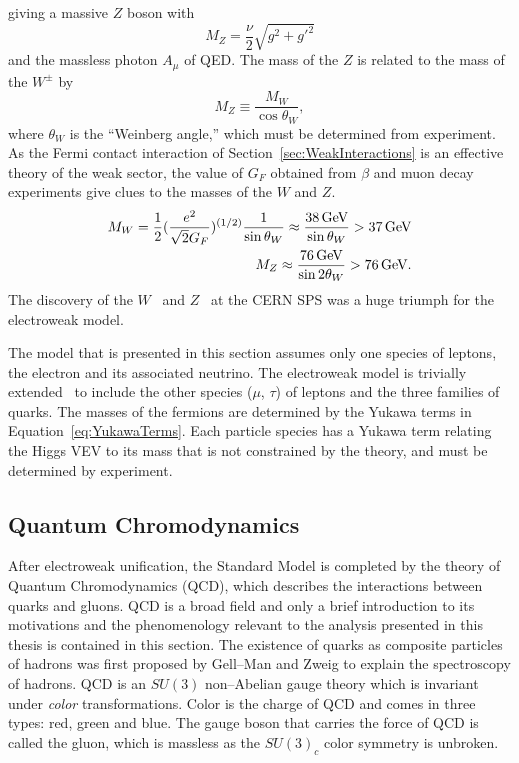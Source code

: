 giving a massive $Z$ boson with 
\begin{equation}
  M_Z = \frac{\nu}{2}\sqrt{g^2 + g'^2} 
  \label{eq:ZBosonMass}
\end{equation}
and the massless photon $A_\mu$ of QED\@.  The mass of the $Z$ is related to the
mass of the $W^\pm$ by 
\begin{equation}
  M_Z \equiv \frac{M_W}{\cos \theta_W},
  \nonumber
\end{equation}
where $\theta_W$ is the ``Weinberg angle,'' which must be determined from
experiment.  As the Fermi contact interaction of
Section~\ref{sec:WeakInteractions} is an effective theory of the weak sector,
the value of $G_F$ obtained from $\beta$ and muon decay experiments give clues
to the masses of the $W$ and $Z$.  
\begin{eqnarray}
  M_W = \frac{1}{2}(\frac{e^2}{\sqrt 2 G_F})^{(1/2)}\frac{1}{\sin\theta_W} \approx
  \frac{38 \,\text{Ge\hspace{-.08em}V}}{\sin\theta_W} > 37 \,\text{Ge\hspace{-.08em}V} \nonumber \\ 
  M_Z \approx \frac{76 \,\text{Ge\hspace{-.08em}V}}{\sin
  2\theta_W} > 76\,\text{Ge\hspace{-.08em}V}\nonumber.
\end{eqnarray}
The discovery of the $W$~\cite{UA1WDiscovery,UA2WDiscovery} and
$Z$~\cite{UA1ZDiscovery, UA2ZDiscovery} at the CERN SPS was a huge triumph for
the electroweak model.

The model that is presented in this section assumes only one species of leptons,
the electron and its associated neutrino.  The electroweak model is trivially
extended~\cite{Morii:SMandBSM} to include the other species ($\mu$, $\tau$) of
leptons and the three families of quarks. The masses of the fermions are
determined by the Yukawa terms in Equation~\ref{eq:YukawaTerms}.  Each particle
species has a Yukawa term relating the Higgs VEV to its mass that is not
constrained by the theory, and must be determined by experiment.

\subsection{Quantum Chromodynamics}

After electroweak unification, the Standard Model is completed by the theory of
Quantum Chromodynamics (QCD), which describes the interactions between quarks
and gluons.  QCD is a broad field and only a brief introduction to its
motivations and the phenomenology relevant to the analysis presented in this
thesis is contained in this section.  The existence of quarks as composite
particles of hadrons was first proposed by Gell--Man and Zweig to explain the
spectroscopy of hadrons.  QCD is an $SU(3)$ non--Abelian gauge theory which is
invariant under \emph{color} transformations.  Color is the charge of QCD and
comes in three types: red, green and blue.  The gauge boson that carries the
force of QCD is called the gluon, which is massless as the $SU(3)_c$ color
symmetry is unbroken.

